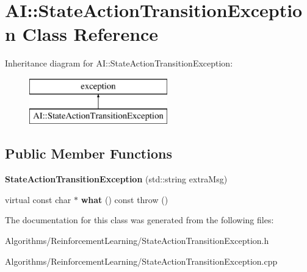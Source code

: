 \hypertarget{classAI_1_1StateActionTransitionException}{\section{A\-I\-:\-:State\-Action\-Transition\-Exception Class Reference}
\label{classAI_1_1StateActionTransitionException}
}
Inheritance diagram for A\-I\-:\-:State\-Action\-Transition\-Exception\-:\begin{figure}[H]
\begin{center}
\leavevmode
\includegraphics[height=2.000000cm]{classAI_1_1StateActionTransitionException}
\end{center}
\end{figure}
\subsection*{Public Member Functions}
\begin{DoxyCompactItemize}
\item 
\hypertarget{classAI_1_1StateActionTransitionException_a496a8b2bb5cdb44c2ffb3dda1d6b75e6}{{\bfseries State\-Action\-Transition\-Exception} (std\-::string extra\-Msg)}\label{classAI_1_1StateActionTransitionException_a496a8b2bb5cdb44c2ffb3dda1d6b75e6}

\item 
\hypertarget{classAI_1_1StateActionTransitionException_ab303c8aa610b6c1cbdd69a18d2c19ecd}{virtual const char $\ast$ {\bfseries what} () const   throw ()}\label{classAI_1_1StateActionTransitionException_ab303c8aa610b6c1cbdd69a18d2c19ecd}

\end{DoxyCompactItemize}


The documentation for this class was generated from the following files\-:\begin{DoxyCompactItemize}
\item 
Algorithms/\-Reinforcement\-Learning/State\-Action\-Transition\-Exception.\-h\item 
Algorithms/\-Reinforcement\-Learning/State\-Action\-Transition\-Exception.\-cpp\end{DoxyCompactItemize}
